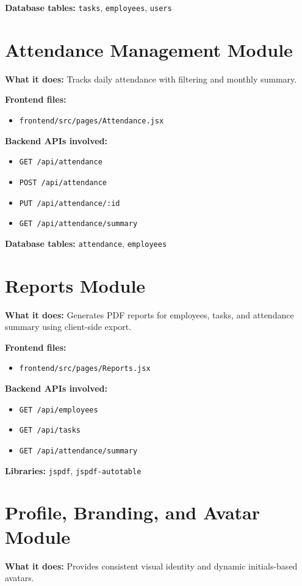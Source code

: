 \textbf{Database tables:} \texttt{tasks}, \texttt{employees}, \texttt{users}

\section{Attendance Management Module}
\textbf{What it does:} Tracks daily attendance with filtering and monthly summary.

\textbf{Frontend files:}
\begin{itemize}[leftmargin=1.3cm]
\item \texttt{frontend/src/pages/Attendance.jsx}
\end{itemize}

\textbf{Backend APIs involved:}
\begin{itemize}[leftmargin=1.3cm]
\item \texttt{GET /api/attendance}
\item \texttt{POST /api/attendance}
\item \texttt{PUT /api/attendance/:id}
\item \texttt{GET /api/attendance/summary}
\end{itemize}

\textbf{Database tables:} \texttt{attendance}, \texttt{employees}

\section{Reports Module}
\textbf{What it does:} Generates PDF reports for employees, tasks, and attendance summary using client-side export.

\textbf{Frontend files:}
\begin{itemize}[leftmargin=1.3cm]
\item \texttt{frontend/src/pages/Reports.jsx}
\end{itemize}

\textbf{Backend APIs involved:}
\begin{itemize}[leftmargin=1.3cm]
\item \texttt{GET /api/employees}
\item \texttt{GET /api/tasks}
\item \texttt{GET /api/attendance/summary}
\end{itemize}

\textbf{Libraries:} \texttt{jspdf}, \texttt{jspdf-autotable}

\section{Profile, Branding, and Avatar Module}
\textbf{What it does:} Provides consistent visual identity and dynamic initials-based avatars.

